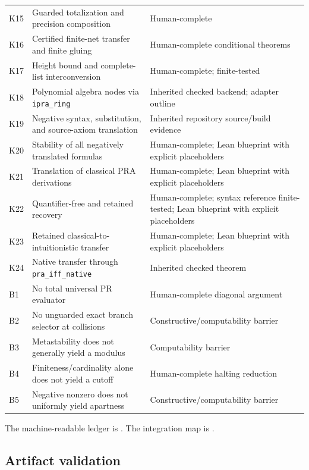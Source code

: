 \begin{longtable}{@{}p{}p{}p{}@{}}
K15 & Guarded totalization and precision composition & Human-complete \\
K16 & Certified finite-net transfer and finite gluing & Human-complete conditional theorems \\
K17 & Height bound and complete-list interconversion & Human-complete; finite-tested \\
K18 & Polynomial algebra nodes via \texttt{ipra\_ring} & Inherited checked backend; adapter outline \\
K19 & Negative syntax, substitution, and source-axiom translation & Inherited repository source/build evidence \\
K20 & Stability of all negatively translated formulas & Human-complete; Lean blueprint with explicit placeholders \\
K21 & Translation of classical PRA derivations & Human-complete; Lean blueprint with explicit placeholders \\
K22 & Quantifier-free and retained recovery & Human-complete; syntax reference finite-tested; Lean blueprint with explicit placeholders \\
K23 & Retained classical-to-intuitionistic transfer & Human-complete; Lean blueprint with explicit placeholders \\
K24 & Native transfer through \texttt{pra\_iff\_native} & Inherited checked theorem \\
B1 & No total universal PR evaluator & Human-complete diagonal argument \\
B2 & No unguarded exact branch selector at collisions & Constructive/computability barrier \\
B3 & Metastability does not generally yield a modulus & Computability barrier \\
B4 & Finiteness/cardinality alone does not yield a cutoff & Human-complete halting reduction \\
B5 & Negative nonzero does not uniformly yield apartness & Constructive/computability barrier \\
\bottomrule
\end{longtable}

The machine-readable ledger is .  The integration map is .

\subsection{Artifact validation}

